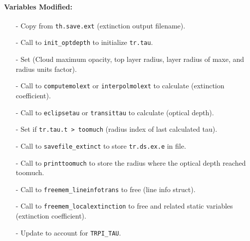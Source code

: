 \documentclass[letterpaper,12pt]{article}
\begin{document}
\paragraph{Variables Modified:}
\begin{enumerate}[leftmargin=10pt, noitemsep, parsep=0pt, topsep=0ex]
\item[-] Copy  from {\tt th.save.ext} (extinction
  output filename).
\item[-] Call to {\tt init\_optdepth} to initialize {\tt tr.tau}.
\item[-] Set 
  (Cloud maximum opacity, top layer radius, layer radius of maxe, and
  radius units factor).
\item[-] Call to {\tt computemolext} or {\tt interpolmolext} to calculate
   (extinction coefficient).
\item[-] Call to {\tt eclipsetau} or {\tt transittau} to calculate
   (optical depth).
\item[-] Set  if {\tt tr.tau.t > toomuch}
  (radius index of last calculated tau).
\item[-] Call to {\tt savefile\_extinct} to store {\tt tr.ds.ex.e} in
  file.
\item[-] Call to {\tt printtoomuch} to store the radius where the
  optical depth reached toomuch.
\item[-] Call to {\tt freemem\_lineinfotrans} to free
   (line info struct).
\item[-] Call to {\tt freemem\_localextinction} to free
   and related static variables (extinction
  coefficient).
\item[-] Update  to account for {\tt TRPI\_TAU}.
\end{enumerate}
\end{document}
